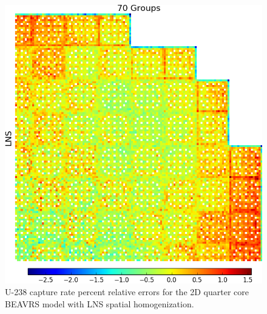 \begin{figure}[h!]
\centering
\includegraphics[width=\linewidth]{figures/patterns/lns/full-core/capt-err-lns}
\vspace{2mm}
\caption[U-238 capture rate errors for \ac{BEAVRS} with LNS homogenization]{U-238 capture rate percent relative errors for the 2D quarter core \ac{BEAVRS} model with \ac{LNS} spatial homogenization.}
\label{fig:chap9-full-core-capt-err-lns}
\end{figure}

\clearpage

